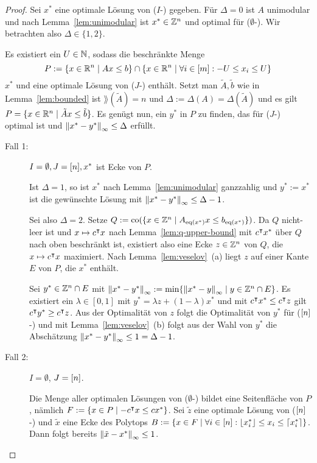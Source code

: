 \begin{proof}
	Sei $x^*$ eine optimale Lösung von ($I$-\MIPI) gegeben.
	Für $\Delta=0$ ist $A$ unimodular und nach Lemma~\ref{lem:unimodular} ist $x^*\in\mathbb{Z}^n$ und optimal für ($\emptyset$-\MIPI).
	Wir betrachten also $\Delta\in\{1,2\}$.
	
	Es existiert ein $U\in\mathbb{N}$, sodass die beschränkte Menge  $$P:=\{x\in\mathbb{R}^n\mid Ax\leq b\} \cap \{x\in\mathbb{R}^n \mid \forall i\in[m]: -U \leq x_i \leq U \}$$
	$x^*$ und eine optimale Lösung von ($J$-\MIPI) enthält.
	Setzt man $\tilde{A},\tilde{b}$ wie in Lemma~\ref{lem:bounded} ist $\rang(\tilde{A})=n$ und $\Delta:=\Delta(A)=\Delta(\tilde{A})$ und es gilt $P=\{ x\in\mathbb{R}^n \mid \tilde{A}x \leq \tilde{b} \}$.
	Es genügt nun, ein $y^*$ in $P$ zu finden, das für ($J$-\MIPI) optimal ist und $\left\lVert x^* - y^*\right\rVert_\infty\leq\Delta$ erfüllt.
	
	\begin{description}
		\item[Fall 1:]  $I=\emptyset,J=[n], x^*$ ist Ecke von $P$.
		
		Ist $\Delta= 1$, so ist $x^*$ nach Lemma~\ref{lem:unimodular} ganzzahlig und $y^* := x^*$ ist die gewünschte Lösung mit $\left\lVert x^*-y^*\right\rVert_\infty\leq \Delta - 1$.
		
		Sei also $\Delta=2$. Setze $Q:=\operatorname{co}(\{x\in\mathbb{Z}^n \mid A_{\operatorname{eq}(x^*)}x \leq b_{\operatorname{eq}(x^*)} \})$.
		Da $Q$ nicht-leer ist und $x\mapsto c^\intercal x$ nach Lemma~\ref{lem:q-upper-bound} mit $c^\intercal x^*$ über $Q$ nach oben beschränkt ist, existiert also eine Ecke $z\in\mathbb{Z}^n$ von $Q$, die $x\mapsto c^\intercal x$ maximiert.
		Nach Lemma~\ref{lem:veselov}~(a) liegt $z$ auf einer Kante $E$ von $P$, die $x^*$ enthält.
		
		Sei $y^*\in\mathbb{Z}^n\cap E$ mit $\left\lVert x^* - y^*\right\rVert_\infty := \min\{ \left\lVert x^*-y\right\rVert_\infty \mid y\in\mathbb{Z}^n\cap E  \}$.
		Es existiert ein $\lambda\in [0,1]$ mit $y^* = \lambda z + (1-\lambda)x^*$ und mit $c^\intercal x^* \leq c^\intercal z$ gilt $c^\intercal y^* \geq c^\intercal z$.
		Aus der Optimalität von $z$ folgt die Optimalität von $y^*$ für ($[n]$-\MIPI) und mit Lemma~\ref{lem:veselov}~(b) folgt aus der Wahl von $y^*$ die Abschätzung $\left\lVert x^*-y^*\right\rVert_\infty\leq 1=\Delta-1$.

		\item[Fall 2:] $I=\emptyset$, $J=[n]$.
		
		Die Menge aller optimalen Lösungen von ($\emptyset$-\MIPI) bildet eine Seitenfläche von $P$, nämlich $F:=\{x\in P\mid -c^\intercal x \leq cx^* \}$.
		Sei $\tilde{z}$ eine optimale Lösung von ($[n]$-\MIPI) und $\tilde{x}$ eine Ecke des Polytops $B:=\{ x\in F \mid \forall i \in [n]: \left\lfloor x^*_i \right\rfloor \leq x_i \leq \left\lceil x^*_i \right\rceil \}$.
		Dann folgt bereits $\left\lVert\tilde{x}-x^*\right\rVert_\infty\leq 1$.
		

\end{description}
\end{proof}
